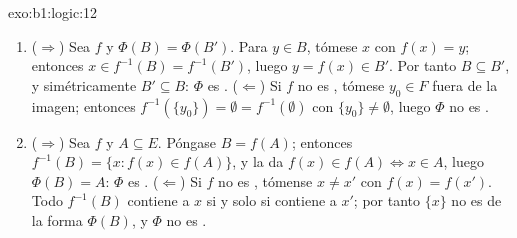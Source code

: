\begin{solution}{exo:b1:logic:12}
\begin{enumerate}
  \item ($\Rightarrow$) Sea $f$  y $\Phi(B) =
        \Phi(B')$. Para $y \in B$, tómese $x$ con $f(x) = y$; entonces
        $x \in f^{-1}(B) = f^{-1}(B')$, luego $y = f(x) \in B'$. Por
        tanto $B \subseteq B'$, y simétricamente $B' \subseteq B$:
        $\Phi$ es . ($\Leftarrow$) Si $f$ no es
        , tómese $y_0 \in F$ fuera de la imagen; entonces
        $f^{-1}(\{y_0\}) = \emptyset = f^{-1}(\emptyset)$ con
        $\{y_0\} \neq \emptyset$, luego $\Phi$ no es .
  \item ($\Rightarrow$) Sea $f$  y $A \subseteq E$. Póngase
        $B = f(A)$; entonces $f^{-1}(B) = \{x : f(x) \in f(A)\}$, y la
         da $f(x) \in f(A) \iff x \in A$, luego $\Phi(B) =
        A$: $\Phi$ es . ($\Leftarrow$) Si $f$ no es
        , tómense $x \neq x'$ con $f(x) = f(x')$. Todo
          $f^{-1}(B)$ contiene a $x$ si y solo
        si contiene a $x'$; por tanto $\{x\}$ no es de la forma
        $\Phi(B)$, y $\Phi$ no es .
\end{enumerate}
\end{solution}

